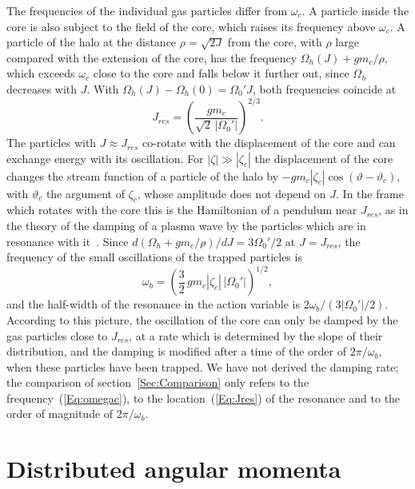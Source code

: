 \documentclass[prd,aps,nofootinbib,superscriptaddress,amsmath,amssymb]{revtex4}
\begin{document}
The frequencies of the individual gas particles differ from $\omega_c$. A particle inside the core is also subject to the field of the core, which raises its frequency above $\omega_c$. A particle of the halo at the distance $\rho = \sqrt{2J}$ from the core, with $\rho$ large compared with the extension of the core, has the frequency $\Omega_h(J) + g m_c/\rho$, which exceeds $\omega_c$ close to the core and falls below it further out, since $\Omega_h$ decreases with $J$. With $\Omega_h(J) - \Omega_h(0) = \Omega_0' J$, both frequencies coincide at
\begin{equation}
J_{res} = \left( \frac{g m_c}{\sqrt{2}\,|\Omega_0'|} \right)^{2/3}.
\label{Eq:Jres}
\end{equation}
The particles with $J\approx J_{res}$ co-rotate with the displacement of the core and can exchange energy with its oscillation. For $|\zeta|\gg|\zeta_c|$ the displacement of the core changes the stream function of a particle of the halo by $-g m_c|\zeta_c|\cos(\vartheta - \vartheta_c)$, with $\vartheta_c$ the argument of $\zeta_c$, whose amplitude does not depend on $J$. In the frame which rotates with the core this is the Hamiltonian of a pendulum near $J_{res}$, as in the theory of the damping of a plasma wave by the particles which are in resonance with it~\cite{tO65}. Since $d(\Omega_h + g m_c/\rho)/dJ = 3\Omega_0'/2$ at $J = J_{res}$, the frequency of the small oscillations of the trapped particles is
\begin{equation}
\omega_b = \left( \frac{3}{2}\, g m_c |\zeta_c|\, |\Omega_0'| \right)^{1/2},
\label{Eq:omegab}
\end{equation}
and the half-width of the resonance in the action variable is $2\omega_b/(3|\Omega_0'|/2)$. According to this picture, the oscillation of the core can only be damped by the gas particles close to $J_{res}$, at a rate which is determined by the slope of their distribution, and the damping is modified after a time of the order of $2\pi/\omega_b$, when these particles have been trapped. We have not derived the damping rate; the comparison of section~\ref{Sec:Comparison} only refers to the frequency~(\ref{Eq:omegac}), to the location~(\ref{Eq:Jres}) of the resonance and to the order of magnitude of $2\pi/\omega_b$.


\section{Distributed angular momenta}
\label{Sec:DistL}
\end{document}
